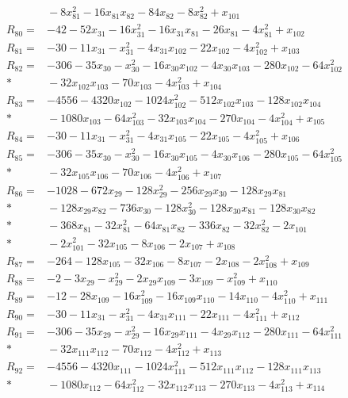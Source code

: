 \begin{align*}
&{}-8x_{81}^{2}-16x_{81}x_{82}-84x_{82}-8x_{82}^{2}+x_{101}\\[3pt]
R_{80}={}&-42-52x_{31}-16x_{31}^{2}-16x_{31}x_{81}-26x_{81}-4x_{81}^{2}+x_{102}\\[3pt]
R_{81}={}&-30-11x_{31}-x_{31}^{2}-4x_{31}x_{102}-22x_{102}-4x_{102}^{2}+x_{103}\\[3pt]
R_{82}={}&-306-35x_{30}-x_{30}^{2}-16x_{30}x_{102}-4x_{30}x_{103}-280x_{102}-64x_{102}^{2}\\*
&{}-32x_{102}x_{103}-70x_{103}-4x_{103}^{2}+x_{104}\\[3pt]
R_{83}={}&-4556-4320x_{102}-1024x_{102}^{2}-512x_{102}x_{103}-128x_{102}x_{104}\\*
&{}-1080x_{103}-64x_{103}^{2}-32x_{103}x_{104}-270x_{104}-4x_{104}^{2}+x_{105}\\[3pt]
R_{84}={}&-30-11x_{31}-x_{31}^{2}-4x_{31}x_{105}-22x_{105}-4x_{105}^{2}+x_{106}\\[3pt]
R_{85}={}&-306-35x_{30}-x_{30}^{2}-16x_{30}x_{105}-4x_{30}x_{106}-280x_{105}-64x_{105}^{2}\\*
&{}-32x_{105}x_{106}-70x_{106}-4x_{106}^{2}+x_{107}\\[3pt]
R_{86}={}&-1028-672x_{29}-128x_{29}^{2}-256x_{29}x_{30}-128x_{29}x_{81}\\*
&{}-128x_{29}x_{82}-736x_{30}-128x_{30}^{2}-128x_{30}x_{81}-128x_{30}x_{82}\\*
&{}-368x_{81}-32x_{81}^{2}-64x_{81}x_{82}-336x_{82}-32x_{82}^{2}-2x_{101}\\*
&{}-2x_{101}^{2}-32x_{105}-8x_{106}-2x_{107}+x_{108}\\[3pt]
R_{87}={}&-264-128x_{105}-32x_{106}-8x_{107}-2x_{108}-2x_{108}^{2}+x_{109}\\[3pt]
R_{88}={}&-2-3x_{29}-x_{29}^{2}-2x_{29}x_{109}-3x_{109}-x_{109}^{2}+x_{110}\\[3pt]
R_{89}={}&-12-28x_{109}-16x_{109}^{2}-16x_{109}x_{110}-14x_{110}-4x_{110}^{2}+x_{111}\\[3pt]
R_{90}={}&-30-11x_{31}-x_{31}^{2}-4x_{31}x_{111}-22x_{111}-4x_{111}^{2}+x_{112}\\[3pt]
R_{91}={}&-306-35x_{29}-x_{29}^{2}-16x_{29}x_{111}-4x_{29}x_{112}-280x_{111}-64x_{111}^{2}\\*
&{}-32x_{111}x_{112}-70x_{112}-4x_{112}^{2}+x_{113}\\[3pt]
R_{92}={}&-4556-4320x_{111}-1024x_{111}^{2}-512x_{111}x_{112}-128x_{111}x_{113}\\*
&{}-1080x_{112}-64x_{112}^{2}-32x_{112}x_{113}-270x_{113}-4x_{113}^{2}+x_{114}\\[3pt]

\end{align*}
